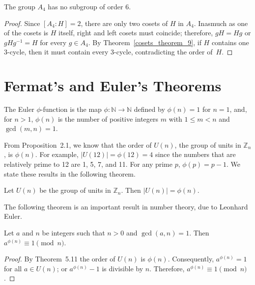 \begin{corollary}\label{cosets_theorem_10}
The group $A_4$ has no subgroup of order 6.
\end{corollary}

\begin{proof}
Since $[A_4 : H] = 2$, there are only two cosets of $H$ in $A_4$.  Inasmuch as one of the cosets is $H$ itself, right and left cosets must coincide; therefore, $gH = Hg$ or $g H g^{-1} = H$ for every $g \in A_4$.  By Theorem~\ref{cosets_theorem_9}, if $H$ contains one 3-cycle, then it must contain every 3-cycle, contradicting the order of~$H$. \hspace*{1in}
\end{proof}
 

\section{Fermat's and Euler's Theorems}

The {\bfi Euler} $\phi$-{\bfi function\/} is the map $\phi : {\mathbb N } \rightarrow {\mathbb N}$ defined by $\phi(n) = 1$ for $n=1$, and, for $n > 1$,  $\phi(n)$ is the number of positive integers $m$ with $1 \leq m < n$ and $\gcd(m,n) = 1$. 

From Proposition~2.1, we know that the order of $U(n)$, the group of units in ${\mathbb Z}_n$, is $\phi(n)$. For example, $|U(12)| = \phi(12)  = 4$ since the numbers that are relatively prime to 12 are 1, 5, 7, and 11. For any prime $p$, $\phi(p) = p-1$.  We state these results in the following theorem.

\begin{theorem}\label{cosets_theorem_11}
Let $U(n)$ be the group of units in ${\mathbb Z}_n$.  Then $|U(n)| = \phi(n)$.
\end{theorem}

The following theorem is an important result in number theory, due to Leonhard Euler. 

\begin{theorem}\label{cosets_theorem_12}
Let $a$ and $n$ be integers such that $n>0$ and $\gcd(a, n) = 1$.  Then $a^{\phi(n)} \equiv 1 \pmod{n}$.
\end{theorem}

\begin{proof}
By Theorem~5.11 the order of $U(n)$ is $\phi(n)$.  Consequently, $a^{\phi(n)} = 1$ for all $a \in U(n)$; or $a^{\phi(n)} - 1$ is divisible by $n$.  Therefore, $a^{\phi(n)} \equiv 1 \pmod{n}$.  
\mbox{\hspace{1in}}
\end{proof}

